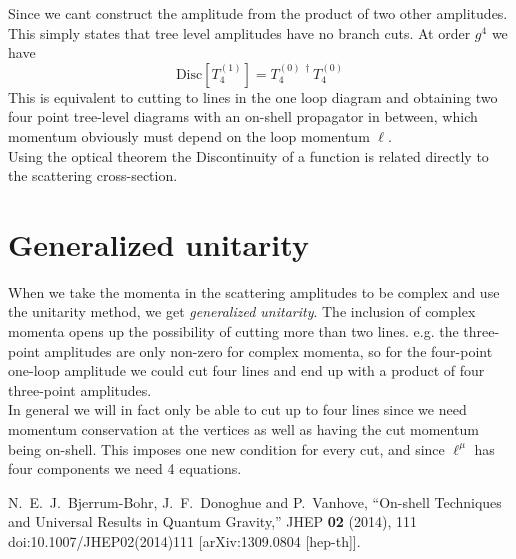 \documentclass[a4paper,12pt]{article}
\begin{document}
Since we cant construct the amplitude from the product of two other amplitudes. This simply states that tree level amplitudes have no branch cuts. At order $g^4$ we have 
\begin{equation}
	\text{Disc}[T_4^{(1)}]=T_4^{(0)\,\dagger} T_4^{(0)}
\end{equation}
This is equivalent to cutting to lines in the one loop diagram and obtaining two four point tree-level diagrams with an on-shell propagator in between, which momentum obviously must depend on the loop momentum $\ell$.\\
Using the optical theorem the Discontinuity of a function is related directly to the scattering cross-section.
\section{Generalized unitarity}
When we take the momenta in the scattering amplitudes to be complex and use the unitarity method, we get \textit{generalized unitarity}. The inclusion of complex momenta opens up the possibility of cutting more than two lines. e.g. the three-point amplitudes are only non-zero for complex momenta, so for the four-point one-loop amplitude we could cut four lines and end up with a product of four three-point amplitudes.\\
In general we will in fact only be able to cut up to four lines since we need momentum conservation at the vertices as well as having the cut momentum being on-shell. This imposes one new condition for every cut, and since $\ell^\mu$ has four components we need 4 equations.
\newpage
\begin{thebibliography}{99}

N.~E.~J.~Bjerrum-Bohr, J.~F.~Donoghue and P.~Vanhove,
``On-shell Techniques and Universal Results in Quantum Gravity,''
JHEP \textbf{02} (2014), 111
doi:10.1007/JHEP02(2014)111
[arXiv:1309.0804 [hep-th]].

\end{thebibliography}
\end{document}
